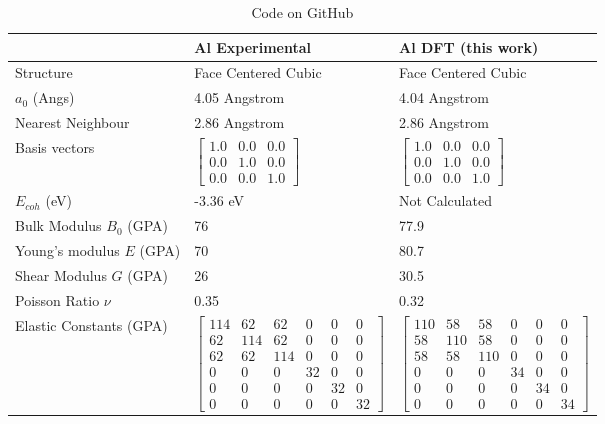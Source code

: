 \renewcommand{\arraystretch}{1.7}
\begin{table}[ht]
\begin{tabular}{lll}
\hline
& Al Experimental & Al DFT (this work)  \\
\hline
Structure                    & Face Centered Cubic & Face Centered Cubic  \\
$a_0$ (Angs)                 & 4.05 Angstrom & 4.04 Angstrom \\
Nearest Neighbour            & 2.86 Angstrom & 2.86 Angstrom \\
Basis vectors                & $\begin{bmatrix} 1.0 & 0.0 & 0.0 \\ 0.0 & 1.0 & 0.0 \\ 0.0 & 0.0 & 1.0 \end{bmatrix}$ & $\begin{bmatrix} 1.0 & 0.0 & 0.0 \\ 0.0 & 1.0 & 0.0 \\ 0.0 & 0.0 & 1.0 \end{bmatrix}$ \\
$E_{coh}$ (eV)               & -3.36 eV &  Not Calculated \\
Bulk Modulus $B_0$ (GPA)     & 76  & 77.9 \\
Young's modulus $E$ (GPA)    & 70  & 80.7 \\
Shear Modulus $G$ (GPA)      & 26  & 30.5 \\
Poisson Ratio $\nu$          & 0.35  & 0.32 \\
Elastic Constants (GPA)      & $\begin{bmatrix} 114 & 62 & 62 & 0 & 0 & 0 \\ 62 & 114 & 62 & 0 & 0 & 0 \\ 62 & 62 & 114 & 0 & 0 & 0 \\ 0 & 0 & 0 & 32 & 0 & 0 \\ 0 & 0 & 0 & 0 & 32 & 0 \\ 0 & 0 & 0 & 0 & 0 & 32 \end{bmatrix}$ & $\begin{bmatrix} 110 & 58 & 58 & 0 & 0 & 0 \\ 58 & 110 & 58 & 0 & 0 & 0 \\ 58 & 58 & 110 & 0 & 0 & 0 \\ 0 & 0 & 0 & 34 & 0 & 0 \\ 0 & 0 & 0 & 0 & 34 & 0 \\ 0 & 0 & 0 & 0 & 0 & 34 \end{bmatrix}$ \\
\end{tabular}
\label{tab:multicol}
\caption{Code on GitHub}
\end{table}




